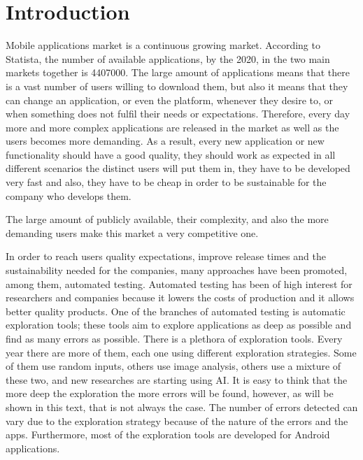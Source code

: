 
\chapter{Introduction} %

\label{Chapter1} %

Mobile applications market is a continuous growing market. According to Statista, the number of available applications, by the 2020, in the two main markets together is 4407000. The large amount of applications means that there is a vast number of users willing to download them, but also it means that they can change an application, or even the platform, whenever they desire to, or when something does not fulfil their needs or expectations. Therefore, every day more and more complex applications are released in the market as well as the users becomes more demanding. As a result, every new application or new functionality should have a good quality, they should work as expected in all different scenarios the distinct users will put them in, they have to be developed very fast and also, they have to be cheap in order to be sustainable for the company who develops them. 

The large amount of publicly available, their complexity, and also the more demanding users make this market a very competitive one.

In order to reach users quality expectations, improve release times  and the sustainability needed for the companies, many approaches have been promoted, among them, automated testing. Automated testing has been of high interest for researchers and companies because it lowers the costs of production and it allows better quality products. One of the branches of automated testing is automatic exploration tools; these tools aim to explore  applications as deep as possible and find as many errors as possible. There is a plethora of exploration tools. Every year there are more of them, each one using different exploration strategies. Some of them use random inputs, others use image analysis, others use a mixture of these two, and new researches are starting using AI. It is easy to think that the more deep the exploration the more errors will be found, however, as will be shown in this text, that is not always the case. The number of errors detected can vary due to the exploration strategy because of the nature of the errors  and the apps. Furthermore, most of the exploration tools are developed for Android applications.


